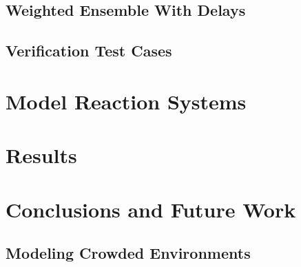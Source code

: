 \documentclass[english,letterpaper,12pt]{article}
\begin{document}
\begin{doublespacing}

\subsection{Weighted Ensemble With Delays} %
\label{sub:we-delays}


\subsection{Verification Test Cases} %
\label{sub:verification}





\section{Model Reaction Systems} %
\label{sec:model-systems}

\section{Results} %
\label{sec:results}

\section{Conclusions and Future Work} %
\label{sec:conclusions}

\subsection{Modeling Crowded Environments} %
\label{sub:diffusion-crowded}




\end{doublespacing}

\appendix



\end{document}

